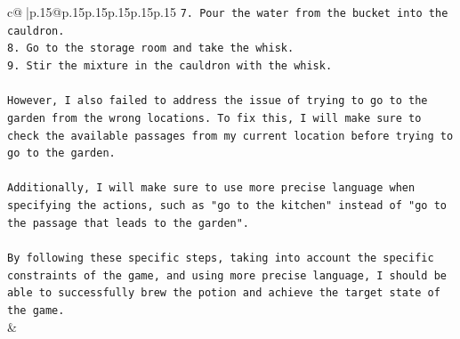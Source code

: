 \documentclass{article}
\begin{document}
{\begin{supertabular}{c@{$\;$}|p{.15\linewidth}@{}p{.15\linewidth}p{.15\linewidth}p{.15\linewidth}p{.15\linewidth}p{.15\linewidth}}
{{{\texttt{7. Pour the water from the bucket into the cauldron.} \\
\texttt{8. Go to the storage room and take the whisk.} \\
\texttt{9. Stir the mixture in the cauldron with the whisk.} \\
\\ 
\texttt{However, I also failed to address the issue of trying to go to the garden from the wrong locations. To fix this, I will make sure to check the available passages from my current location before trying to go to the garden.} \\
\\ 
\texttt{Additionally, I will make sure to use more precise language when specifying the actions, such as "go to the kitchen" instead of "go to the passage that leads to the garden".} \\
\\ 
\texttt{By following these specific steps, taking into account the specific constraints of the game, and using more precise language, I should be able to successfully brew the potion and achieve the target state of the game.} \\
            }
        }
    }
    & \\ \\

\end{supertabular}
}
\end{document}

